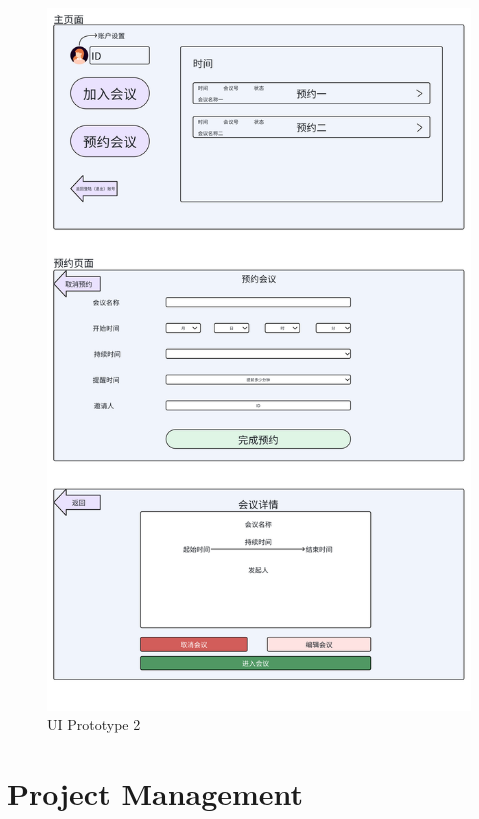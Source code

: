 \documentclass{article}
\begin{document}
\newpage
\begin{figure}[H]
  \center
  \includegraphics[scale=0.1]{diagrams/ui-prototype-2.png}
  \caption{UI Prototype 2}
\end{figure}

\section{Project Management}
\end{document}
